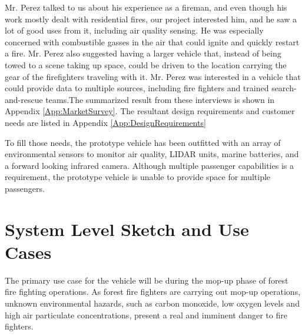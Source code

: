 Mr. Perez talked to us about his experience as a fireman, and even though his work mostly dealt with residential fires, our project interested him, and he saw a lot of good uses from it, including air quality sensing. He was especially concerned with combustible gasses in the air that could ignite and quickly restart a fire. Mr. Perez also suggested having a larger vehicle that, instead of being towed to a scene taking up space, could be driven to the location carrying the gear of the firefighters traveling with it. Mr. Perez was interested in a vehicle that could provide data to multiple sources, including fire fighters and trained search-and-rescue teams.The summarized result from these interviews is shown in Appendix \ref{App:MarketSurvey}. The resultant design requirements and customer needs are listed in Appendix \ref{App:DesignRequirements} 

To fill those needs, the prototype vehicle has been outfitted with an array of environmental sensors to monitor air quality, LIDAR units, marine batteries, and a forward looking infrared camera. Although multiple passenger capabilities is a requirement, the prototype vehicle is unable to provide space for multiple passengers.

%
\section{System Level Sketch and Use Cases}
The primary use case for the vehicle will be during the mop-up phase of forest fire fighting operations. As forest fire fighters are carrying out mop-up operations, unknown environmental hazards, such as carbon monoxide, low oxygen levels and high air particulate concentrations,  present a real and imminent danger to fire fighters. 

